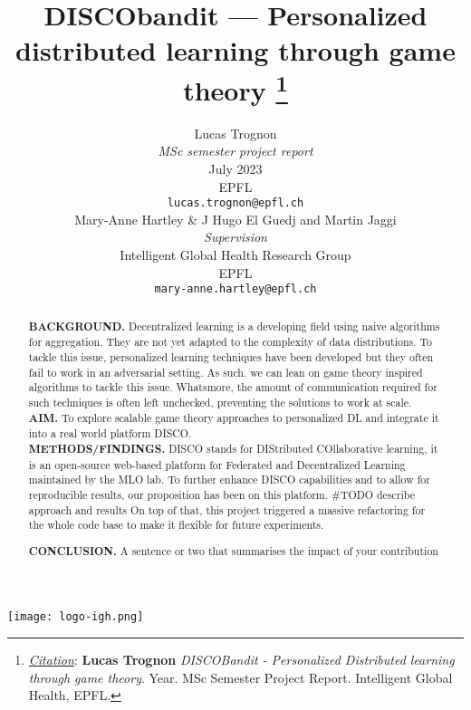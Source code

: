 \documentclass{article}
\title{DISCObandit --- Personalized distributed learning through game theory
\thanks{\textit{\underline{Citation}}: 
\textbf{Lucas Trognon} \textit{DISCOBandit - Personalized Distributed learning through game theory}. Year. MSc Semester Project Report. Intelligent Global Health, EPFL.  } 
}
\author{
  Lucas Trognon \\
  \textit{MSc semester project report} \\
  July 2023 \\
  EPFL\\
  \texttt{lucas.trognon@epfl.ch} \\
   \And
  Mary-Anne Hartley \& J
  Hugo El Guedj and  Martin Jaggi
  \\
  \textit{Supervision}
  \\
  Intelligent Global Health Research Group \\
  EPFL\\
  \texttt{mary-anne.hartley@epfl.ch} \\
}
\begin{document}
\maketitle

    \begin{center}
        \texttt{[image: logo-igh.png]}
        \vspace{1cm}
    \end{center}

\begin{abstract}
    \textbf{BACKGROUND.} 
    Decentralized learning is a developing field using naive algorithms for aggregation. They are not yet adapted to the complexity of data distributions. To tackle this issue, personalized learning techniques have been developed but they often fail to work in an adversarial setting.
    As such. we can lean on game theory inspired algorithms to tackle this issue.
    Whatsmore, the amount of communication required for such techniques is often left unchecked, preventing the solutions to work at scale.\\
    \textbf{AIM.} To explore scalable game theory approaches to personalized DL and integrate it into a real world platform DISCO.\\
    \textbf{METHODS/FINDINGS.} DISCO stands for DIStributed COllaborative learning, it is an open-source web-based platform for Federated and Decentralized Learning maintained by the MLO lab. To further enhance DISCO capabilities and to allow for reproducible results, our proposition has been on this platform. \#TODO describe approach and results
    On top of that, this project triggered a massive refactoring for the whole code base to make it flexible for future experiments.
    
    \textbf{CONCLUSION.} A sentence or two that summarises the impact of your contribution\\
\end{abstract}


\end{document}
